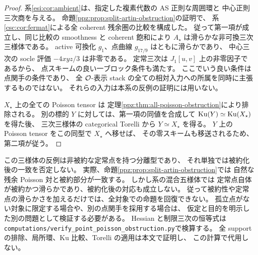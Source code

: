 \begin{proof}
系\ref{esi:cor:ambient}は、指定した複素代数の AS 正則な周囲環と
中心正則三次商を与える。
命題\ref{ppz:prop:split-artin-obstruction}の証明で、
系\ref{csc:cor:fermat}による全 coherent 残余圏の比較を構成した。
従って第一項が成立し、同じ比較の smoothness と coherent 飽和により
$A_\star$ は滑らかな非可換三次三様体である。
active 可換化 $g_1$、点曲線 $g_{17/9}$ はともに滑らかであり、
中心三次の socle 評価 $-4xyz/3$ は非零である。
定常三次は $J_1[u,v]$ 上の非零因子であるから、
点スキームの良い一ブロック条件も満たす。
ここでいう良い条件は点関手の条件であり、
全 $\mathcal O$-表示 stack の全ての相対入力への所属を同時に主張するものではない。
それらの入力は本系の反例の証明には用いない。

$X_\star$ 上の全ての Poisson tensor は
定理\ref{ppz:thm:all-poisson-obstruction}により排除される。
別の標的 $Y$ に対しては、第一項の同値を合成して
$\operatorname{Ku}(Y)\simeq\operatorname{Ku}(X_\star)$ を得た後、
三次三様体の categorical Torelli
\cite[Theorem~1.1]{NFMThreefoldCategoricalTorelli}から $Y\simeq X_\star$ を得る。
$Y$ 上の Poisson tensor をこの同型で $X_\star$ へ移せば、
その零スキームも移送されるため、第二項が従う。
\end{proof}

\begin{remark}[反例が排除する範囲と残る問題]
この三様体の反例は非被約な定常点を持つ分離型であり、
それ単独では被約化後の一致を否定しない。
実際、命題\ref{ppz:prop:split-artin-obstruction}では
自然な残余 Poisson 対と被約部分が一致する。
しかし系の混合五様体では
定常点自体が被約かつ滑らかであり、被約化後の対応も成立しない。
従って被約性や定常点の滑らかさを加えるだけでは、全対象での命題を回復できない。
孤立点がない対象に限定する場合や、別の点関手を採用する場合は、
仮定と目的を明示した別の問題として検証する必要がある。
Hessian と制限三次の恒等式は
\texttt{computations/verify\_point\_poisson\_obstruction.py}で検算する。
全 support の排除、局所環、Ku 比較、Torelli の適用は本文で証明し、
この計算で代用しない。
\end{remark}

